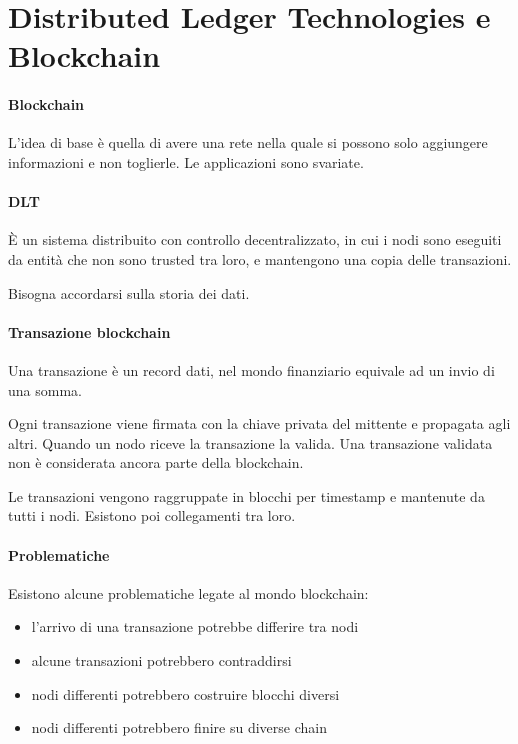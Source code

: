 \section{Distributed Ledger Technologies e Blockchain}

\paragraph{Blockchain}
L'idea di base è quella di avere una rete nella quale 
si possono solo aggiungere informazioni e non toglierle. 
Le applicazioni sono svariate.

\paragraph{DLT}
È un sistema distribuito con controllo decentralizzato, in cui i 
nodi sono eseguiti da entità che non sono trusted tra loro, 
e mantengono una copia delle transazioni.

Bisogna accordarsi sulla storia dei dati.

\paragraph{Transazione blockchain}
Una transazione è un record dati, nel mondo finanziario
equivale ad un invio di una somma.

Ogni transazione viene firmata con la chiave privata del mittente e propagata 
agli altri. 
Quando un nodo riceve la transazione la valida. Una transazione validata non 
è considerata ancora parte della blockchain.

Le transazioni vengono raggruppate in blocchi per timestamp e mantenute 
da tutti i nodi. Esistono poi collegamenti tra loro.

\paragraph{Problematiche}
Esistono alcune problematiche legate al mondo blockchain:
\begin{itemize}
    \item l'arrivo di una transazione potrebbe differire tra nodi
    \item alcune transazioni potrebbero contraddirsi
    \item nodi differenti potrebbero costruire blocchi diversi
    \item nodi differenti potrebbero finire su diverse chain
\end{itemize}

